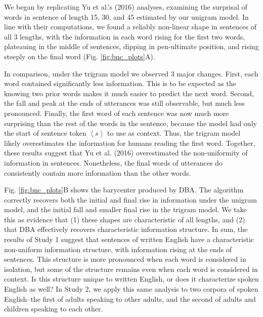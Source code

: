 \documentclass[10pt, letterpaper]{article}
\begin{document}
We began by replicating Yu et al.'s (2016) analyses, examining the
surprisal of words in sentence of length 15, 30, and 45 estimated by our
unigram model. In line with their computations, we found a reliably
non-linear shape in sentences of all 3 lengths, with the information in
each word rising for the first two words, plateauing in the middle of
sentences, dipping in pen-ultimate position, and rising steeply on the
final word (Fig. \ref{fig:bnc_plots}A).

In comparison, under the trigram model we observed 3 major changes.
First, each word contained significantly less information. This is to be
expected as the knowing two prior words makes it much easier to predict
the next word. Second, the fall and peak at the ends of utterances was
still observable, but much less pronounced. Finally, the first word of
each sentence was now much more surprising than the rest of the words in
the sentence, because the model had only the start of sentence token
\(\left<s\right>\) to use as context. Thus, the trigram model likely
overestimates the information for humans reading the first word.
Together, these results suggest that Yu et al. (2016) overestimated the
non-uniformity of information in sentences. Nonetheless, the final words
of utterances do consistently contain more information than the other
words.

Fig. \ref{fig:bnc_plots}B shows the barycenter produced by DBA. The
algorithm correctly recovers both the initial and final rise in
information under the unigram model, and the initial fall and smaller
final rise in the trigram model. We take this as evidence that (1) these
shapes are characteristic of all lengths, and (2) that DBA effectively
recovers characteristic information structure. In sum, the results of
Study 1 suggest that sentences of written English have a characteristic
non-uniform information structure, with information rising at the ends
of sentences. This structure is more pronounced when each word is
considered in isolation, but some of the structure remains even when
each word is considered in context. Is this structure unique to written
English, or does it characterize spoken English as well? In Study 2, we
apply this same analysis to two corpora of spoken English--the first of
adults speaking to other adults, and the second of adults and children
speaking to each other.
\end{document}
